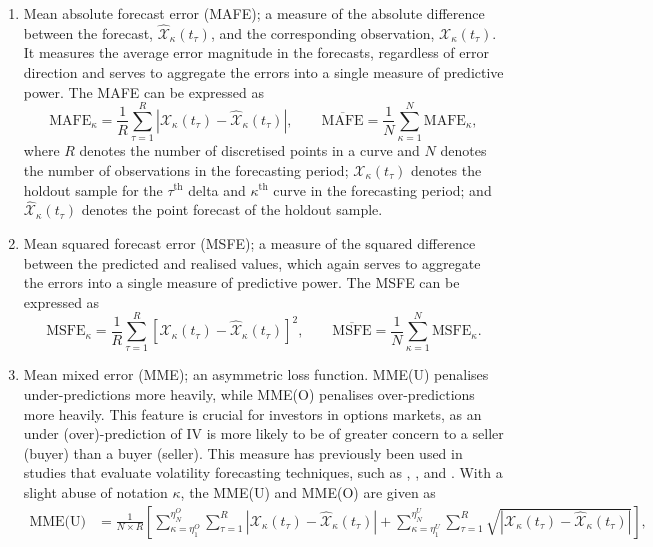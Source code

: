 \documentclass[12pt,a4paper]{article}
\newcommand{\X}{\mathcal{X}}
\begin{document}
\begin{enumerate}
\item[(1)] Mean absolute forecast error (MAFE); a measure of the absolute difference between the forecast, $\widehat{\X}_{\kappa}(t_{\tau})$, and the corresponding observation, $\X_{\kappa}(t_{\tau})$. It measures the average error magnitude in the forecasts, regardless of error direction and serves to aggregate the errors into a single measure of predictive power. The MAFE can be expressed as
\begin{equation*}
\text{MAFE}_{\kappa} = \frac{1}{R}\sum^R_{\tau=1}\left|\X_{\kappa}(t_{\tau}) - \widehat{\X}_{\kappa}(t_{\tau})\right|, \qquad
\overline{\text{MAFE}} = \frac{1}{N}\sum^N_{\kappa=1}\text{MAFE}_{\kappa},
\end{equation*}
where $R$ denotes the number of discretised points in a curve and $N$ denotes the number of observations in the forecasting period; $\X_{\kappa}(t_{\tau})$ denotes the holdout sample for the $\tau^{\text{th}}$ delta and $\kappa^{\text{th}}$ curve in the forecasting period; and $\widehat{\X}_{\kappa}(t_{\tau})$ denotes the point forecast of the holdout sample. 
\item[(2)] Mean squared forecast error (MSFE); a measure of the squared difference between the predicted and realised values, which again serves to aggregate the errors into a single measure of predictive power. The MSFE can be expressed as
\begin{equation*}
\text{MSFE}_{\kappa} = \frac{1}{R}\sum^R_{\tau=1}\left[\X_{\kappa}(t_{\tau}) - \widehat{\X}_{\kappa}(t_{\tau})\right]^2, \qquad
\overline{\text{MSFE}} = \frac{1}{N}\sum^N_{\kappa=1}\text{MSFE}_{\kappa}.
\end{equation*}
\item[(3)] Mean mixed error (MME); an asymmetric loss function. MME(U) penalises under-predictions more heavily, while MME(O) penalises over-predictions more heavily. This feature is crucial for investors in options markets, as an under (over)-prediction of IV is more likely to be of greater concern to a seller (buyer) than a buyer (seller). This measure has previously been used in studies that evaluate volatility forecasting techniques, such as \cite{BF96}, \cite{FIK09}, and \cite{KCM18}. With a slight abuse of notation $\kappa$, the MME(U) and MME(O) are given as
\begin{align*}
\text{MME(U)} &= \frac{1}{N\times R}\left[\sum_{\kappa = \eta_1^O}^{\eta_N^O}\sum^R_{\tau=1}\left|\X_{\kappa}(t_{\tau}) - \widehat{\X}_{\kappa}(t_{\tau})\right|+\sum_{\kappa = \eta_1^U}^{\eta_N^U}\sum^R_{\tau=1}\sqrt{\left|\X_{\kappa}(t_{\tau}) - \widehat{\X}_{\kappa}(t_{\tau})\right|}\right], \\

\end{align*}
\end{enumerate}
\end{document}
